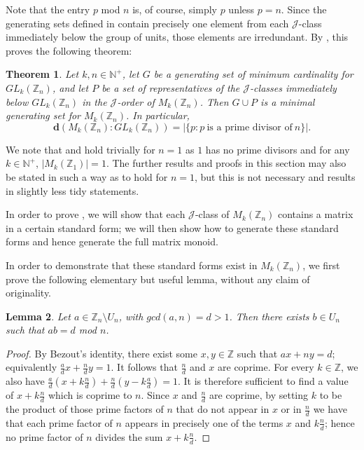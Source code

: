 \documentclass[11pt]{article}
\newtheorem{thm}{Theorem}[subsection]
\newtheorem{lemma}[thm]{Lemma}
\numberwithin{equation}{section}
\newcommand{\set}[2]{\ensuremath{\{#1 : #2 \}}}
\newcommand{\J}{\mathscr{J}}
\newcommand{\N}{\mathbb{N}}
\newcommand{\Np}{\N^{+}}
\newcommand{\Z}{\mathbb{Z}}
\renewcommand{\d}{\mathbf{d}}
\begin{document}
Note that the entry $p$ mod $n$ is, of course, simply $p$ unless $p = n$. Since
the generating sets defined in  contain precisely one
element from each $\J$-class immediately below the group of units, those
elements are irredundant. By , this proves the following
theorem:
\begin{thm}
  Let $k,n \in \Np$, let $G$ be a generating set of minimum cardinality for
  $GL_k(\Z_n)$, and let $P$ be a set of representatives of the
  $\J$-classes immediately below $GL_k(\Z_n)$ in the $\J$-order of
  $M_k(\Z_n)$. Then $G \cup P$ is a minimal generating set for $M_k(\Z_n)$.
  In particular,
  $$\d(M_k(\Z_n) : GL_k(\Z_n))
                       =
                       |\set{p}{p\ \text{is a prime divisor of}\ n}|.
  $$
\end{thm}

We note that  and  hold trivially for
$n = 1$ as $1$ has no prime divisors and for any $k \in \Np$, $|M_k(\Z_1)| = 1$.
The further results and proofs in this section may also be stated in such a way
as to hold for $n=1$, but this is not necessary and results in slightly less
tidy statements.

In order to prove , we will show that each $\J$-class of
$M_k(\Z_n)$ contains a matrix in a certain standard form; we will then show how
to generate these standard forms and hence generate the full matrix monoid.

In order to demonstrate that these standard forms exist in $M_k(\Z_n)$, we first
prove the following elementary but useful lemma, without any claim of
originality.

\begin{lemma}
  Let $a \in \Z_n \setminus U_n$, with $gcd(a, n) = d > 1$. Then there exists $b
  \in U_n$ such that $ab = d$ mod $n$.
\end{lemma}
\begin{proof}
  By Bezout's identity, there exist some $x, y \in \Z$ such that $ax + ny = d$;
  equivalently $\frac{a}{d}x + \frac{n}{d}y = 1$. It follows that
  $\frac{n}{d}$ and $x$ are coprime. For every $k \in \Z$, we also have
  $\frac{a}{d}(x + k\frac{n}{d}) + \frac{n}{d}(y - k\frac{a}{d}) = 1$. It is
  therefore sufficient to find a value of $x + k\frac{n}{d}$ which is coprime to
  $n$. Since $x$ and $\frac{n}{d}$ are coprime, by setting $k$ to be the product
  of those prime factors of $n$ that do not appear in $x$ or in $\frac{n}{d}$ we
  have that each prime factor of $n$ appears in precisely one of the terms $x$
  and $k\frac{n}{d}$; hence no prime factor of $n$ divides the sum $x +
  k\frac{n}{d}$.
\end{proof}
\end{document}

